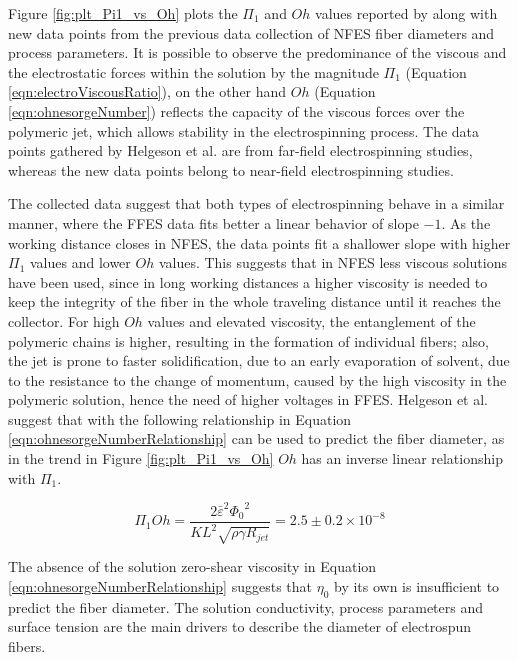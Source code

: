 Figure \ref{fig:plt_Pi1_vs_Oh} plots the $\Pi_1$ and $Oh$ values reported by \cite{Helgeson2007} along with new data points from the previous data collection of NFES fiber diameters and process parameters. It is possible to observe the predominance of the viscous and the electrostatic forces within the solution by the magnitude $\Pi_1$ (Equation \ref{eqn:electroViscousRatio}), on the other hand $Oh$ (Equation \ref{eqn:ohnesorgeNumber}) reflects the capacity of the viscous forces over the polymeric jet, which allows stability in the electrospinning process. The data points gathered by Helgeson et al. are from far-field electrospinning studies, whereas the new data points belong to near-field electrospinning studies.

The collected data suggest that both types of electrospinning behave in a similar manner, where the FFES data fits better a linear behavior of slope $-1$. As the working distance closes in NFES, the data points fit a shallower slope with higher $\Pi_1$ values and lower $Oh$ values. This suggests that in NFES less viscous solutions have been used, since in long working distances a higher viscosity is needed to keep the integrity of the fiber in the whole traveling distance until it reaches the collector. For high $Oh$ values and elevated viscosity, the entanglement of the polymeric chains is higher, resulting in the formation of individual fibers; also, the jet is prone to faster solidification, due to an early evaporation of solvent, due to the resistance to the change of momentum, caused by the high viscosity in the polymeric solution, hence the need of higher voltages in FFES. Helgeson et al. suggest that with the following relationship in Equation \ref{eqn:ohnesorgeNumberRelationship} can be used to predict the fiber diameter, as in the trend in Figure \ref{fig:plt_Pi1_vs_Oh} $Oh$ has an inverse linear relationship with $\Pi_1$. \cite{Helgeson2007}

\begin{equation}\label{eqn:ohnesorgeNumberRelationship}
    \Pi_1 Oh = \frac{2 {\bar{\varepsilon}}^2 {\Phi_0}^2}{K L^2 \sqrt{\rho \gamma R_{jet}}} = 2.5 \pm 0.2 \times 10^{-8}
\end{equation}

The absence of the solution zero-shear viscosity in Equation \ref{eqn:ohnesorgeNumberRelationship} suggests that $\eta_0$ by its own is insufficient to predict the fiber diameter. The solution conductivity, process parameters and surface tension are the main drivers to describe the diameter of electrospun fibers. \cite{Helgeson2007}